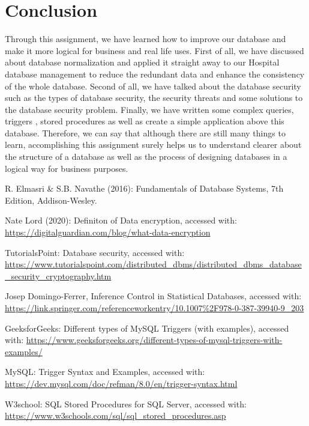 \documentclass[a4paper]{article}
\numberwithin{equation}{section}
\begin{document}
\section{Conclusion}
Through this assignment, we have learned how to improve our database and make it more logical for business and real life uses. First of all, we have discussed about database normalization  and applied it straight away to our Hospital database management to reduce the redundant data and enhance the consistency of the whole database. Second of all, we have talked about the database security such as the types of database security, the security threats and some solutions to the database security problem. Finally, we have written some complex queries, triggers , stored procedures as well as create a simple application above this database. Therefore, we can say that although there are still many things to learn, accomplishing this assignment surely helps us to understand clearer about the structure of a database as well as the process of designing databases in a logical way for business purposes.

\pagebreak
\begin{thebibliography}{9}
  R. Elmasri \& S.B. Navathe (2016): Fundamentals of Database Systems, 7th
  Edition, Addison-Wesley.

  Nate Lord (2020): Definiton of Data encryption, accessed with: \url{https://digitalguardian.com/blog/what-data-encryption}

  TutorialsPoint: Database security, accessed with: \url{https://www.tutorialspoint.com/distributed_dbms/distributed_dbms_database_security_cryptography.htm}

  Josep Domingo-Ferrer, Inference Control in Statistical Databases, accessed with: \url{https://link.springer.com/referenceworkentry/10.1007\%2F978-0-387-39940-9_203}

  GeeksforGeeks: Different types of MySQL Triggers (with examples), accessed with: \url{https://www.geeksforgeeks.org/different-types-of-mysql-triggers-with-examples/}

  MySQL: Trigger Syntax and Examples, accessed with: \url{https://dev.mysql.com/doc/refman/8.0/en/trigger-syntax.html}

  W3school: SQL Stored Procedures for SQL Server, accessed with: \url{https://www.w3schools.com/sql/sql_stored_procedures.asp}

\end{thebibliography}
\end{document}

